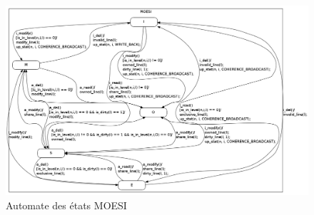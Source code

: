 \begin{figure}[!h]
\begin{center}
   \includegraphics[scale=0.3]{images/MOESI.png}
   \caption{\label{img:state_moesi} Automate des états MOESI}
\end{center}
\end{figure}
